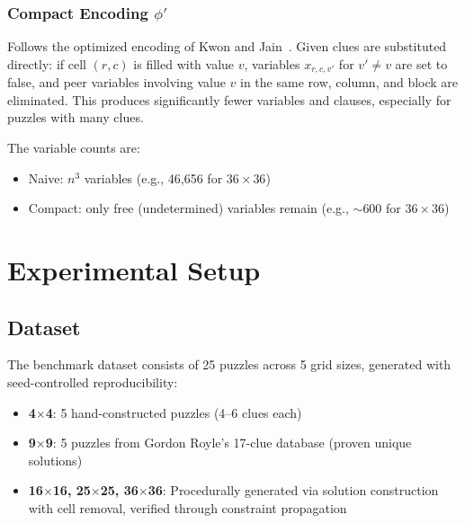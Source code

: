 \documentclass[12pt]{article}
\begin{document}
\subsubsection{Compact Encoding $\phi'$}
Follows the optimized encoding of Kwon and Jain~\citep{KwonJain2006}. Given clues are substituted directly: if cell $(r,c)$ is filled with value $v$, variables $x_{r,c,v'}$ for $v' \neq v$ are set to false, and peer variables involving value $v$ in the same row, column, and block are eliminated. This produces significantly fewer variables and clauses, especially for puzzles with many clues.

The variable counts are:
\begin{itemize}
    \item Naive: $n^3$ variables (e.g., 46{,}656 for $36\times36$)
    \item Compact: only free (undetermined) variables remain (e.g., $\sim$600 for $36\times36$)
\end{itemize}


\section{Experimental Setup}

\subsection{Dataset}
The benchmark dataset consists of 25 puzzles across 5 grid sizes, generated with seed-controlled reproducibility:

\begin{itemize}
    \item \textbf{4$\times$4}: 5 hand-constructed puzzles (4--6 clues each)
    \item \textbf{9$\times$9}: 5 puzzles from Gordon Royle's 17-clue database (proven unique solutions)
    \item \textbf{16$\times$16, 25$\times$25, 36$\times$36}: Procedurally generated via solution construction with cell removal, verified through constraint propagation
\end{itemize}
\end{document}
